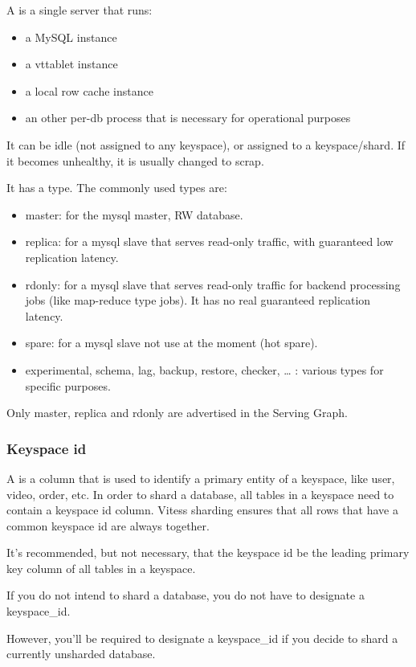 A  is a single server that runs:
\begin{itemize}
\item a MySQL instance
\item a vttablet instance
\item a local row cache instance
\item an other per-db process that is necessary for operational purposes
\end{itemize}

It can be idle (not assigned to any keyspace), or assigned to a keyspace/shard. If it becomes unhealthy, it is usually changed to scrap.

It has a type. The commonly used types are:
\begin{itemize}
\item master: for the mysql master, RW database.
\item replica: for a mysql slave that serves read-only traffic, with guaranteed low replication latency.
\item rdonly: for a mysql slave that serves read-only traffic for backend processing jobs (like map-reduce type jobs). It has no real guaranteed replication latency.
\item spare: for a mysql slave not use at the moment (hot spare).
\item experimental, schema, lag, backup, restore, checker, \ldots{} : various types for specific purposes.
\end{itemize}
Only master, replica and rdonly are advertised in the Serving Graph.

\subsubsection{Keyspace id}\hypertarget{keyspace-id}{}\label{keyspace-id}

A  is a column that is used to identify a primary entity of a keyspace, like user, video, order, etc.
In order to shard a database, all tables in a keyspace need to
contain a keyspace id column.
Vitess sharding ensures that all rows that have a common keyspace id are
always together.

It's recommended, but not necessary, that the keyspace id be the leading primary
key column of all tables in a keyspace.

If you do not intend to shard a database, you do not have to
designate a keyspace\_id.

However, you'll be required to designate a keyspace\_id
if you decide to shard a currently unsharded database.

